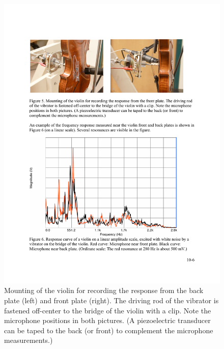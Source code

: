\documentclass[11pt]{NSF}
\begin{document}
\begin{figure}[hbtp]
\begin{center}
\includegraphics[width=.9\textwidth]{fig10_5}
\caption{Mounting of the violin for recording the response from the
back plate (left) and front plate (right). 
The driving rod of the vibrator is fastened off-center to
the bridge of the violin with a clip. Note the microphone positions in
both pictures. (A piezoelectric transducer can be taped to the back
(or front) to complement the microphone measurements.)}
\label{f:5}
\end{center}
\end{figure}
%
\end{document}
